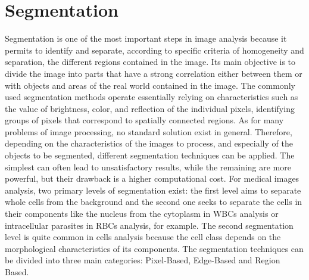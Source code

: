 \chapter{Segmentation}
Segmentation is one of the most important steps in image analysis because it permits to identify and separate, according to specific criteria of homogeneity and separation, the different regions contained in the image. Its main objective is to divide the image into parts that have a strong correlation either between them or with objects and areas of the real world contained in the image. The commonly used segmentation methods operate essentially relying on characteristics such as the value of brightness, color, and reflection of the individual pixels, identifying groups of pixels that correspond to spatially connected regions. 
As for many problems of image processing, no standard solution exist in general. Therefore, depending on the characteristics of the images to process, and especially of the objects to be segmented, different segmentation techniques can be applied. The simplest can often lead to unsatisfactory results, while the remaining are more powerful, but their drawback is a higher computational cost. For medical images analysis, two primary levels of segmentation exist: the first level aims to separate whole cells from the background and the second one seeks to separate the cells in their components like the nucleus from the cytoplasm in WBCs analysis or intracellular parasites in RBCs analysis, for example. The second segmentation level is quite common in cells analysis because the cell class depends on the morphological characteristics of its components. The segmentation techniques can be divided into three main categories: Pixel-Based, Edge-Based and Region Based.

